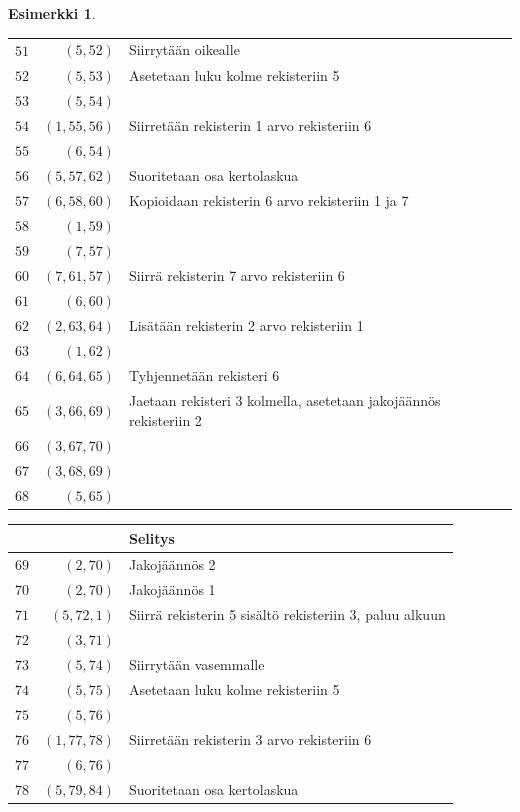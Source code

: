 \documentclass[a4paper, 12pt]{article}
\theoremstyle{definition}
\newtheorem{example}[mydef]{Esimerkki}
\theoremstyle{plain}
\begin{document}
\begin{example}
\begin{tabular}[t]{r|r|l}
$\hat{51}$ & $(5, 52)$  & Siirrytään oikealle\\
$\hat{52}$ & $(5, 53)$  & Asetetaan luku kolme rekisteriin 5\\
$\hat{53}$ & $(5, 54)$  &\\
$\hat{54}$ & $(1, 55, 56)$  & Siirretään rekisterin 1 arvo rekisteriin 6 \\
$\hat{55}$ & $(6, 54)$  &\\
$\hat{56}$ & $(5, 57, 62)$  & Suoritetaan osa kertolaskua\\
$\hat{57}$ & $(6, 58, 60)$  & Kopioidaan rekisterin 6 arvo rekisteriin 1 ja 7\\
$\hat{58}$ & $(1, 59)$  &\\
$\hat{59}$ & $(7, 57)$  &\\
$\hat{60}$ & $(7, 61, 57)$ & Siirrä rekisterin 7 arvo rekisteriin 6 \\
$\hat{61}$ & $(6, 60)$  &\\
$\hat{62}$ & $(2, 63, 64)$  & Lisätään rekisterin 2 arvo rekisteriin 1\\
$\hat{63}$ & $(1, 62)$  &\\
$\hat{64}$ & $(6, 64, 65)$  & Tyhjennetään rekisteri 6\\
$\hat{65}$ & $(3, 66, 69)$  & Jaetaan rekisteri 3 kolmella, asetetaan jakojäännös rekisteriin 2\\
$\hat{66}$ & $(3, 67, 70)$  & \\
$\hat{67}$ & $(3, 68, 69)$  & \\
$\hat{68}$ & $(5, 65)$  & \\
\end{tabular}
\begin{tabular}[t]{r|r|l}
& & Selitys\\
\hline
$\hat{69}$ & $(2, 70)$  & Jakojäännös 2 \\
$\hat{70}$ & $(2, 70)$  & Jakojäännös 1 \\
$\hat{71}$ & $(5, 72, 1)$  & Siirrä rekisterin 5 sisältö rekisteriin 3, paluu alkuun \\
$\hat{72}$ & $(3, 71)$  & \\
$\hat{73}$ & $(5, 74)$  & Siirrytään vasemmalle\\
$\hat{74}$ & $(5, 75)$  & Asetetaan luku kolme rekisteriin 5\\
$\hat{75}$ & $(5, 76)$  &\\
$\hat{76}$ & $(1, 77, 78)$  & Siirretään rekisterin 3 arvo rekisteriin 6 \\
$\hat{77}$ & $(6, 76)$  &\\
$\hat{78}$ & $(5, 79, 84)$  & Suoritetaan osa kertolaskua\\

\end{tabular}
\end{example}
\end{document}

